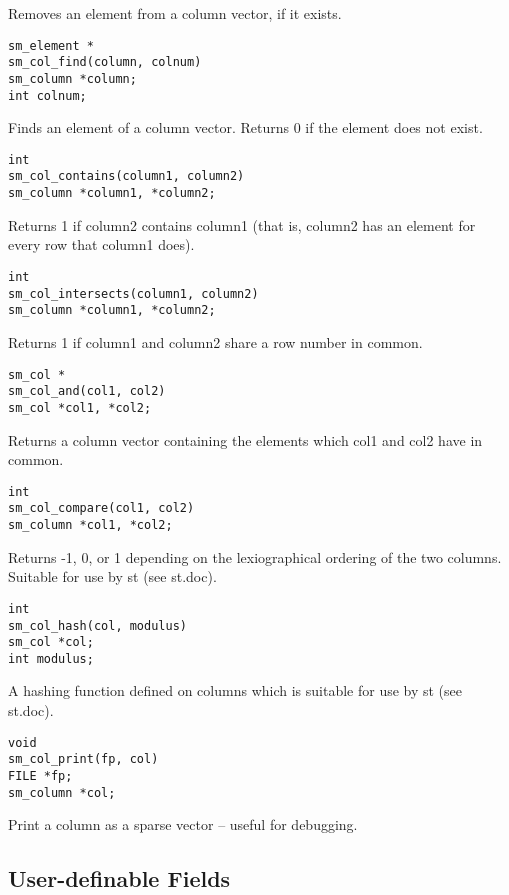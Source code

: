         Removes an element from a column vector, if it exists.


\begin{verbatim}
sm_element *
sm_col_find(column, colnum)
sm_column *column;
int colnum;
\end{verbatim}

        Finds an element of a column vector.  Returns 0 if the element does not
        exist.


\begin{verbatim}
int
sm_col_contains(column1, column2)
sm_column *column1, *column2;
\end{verbatim}

        Returns 1 if column2 contains column1 (that is, column2 has
        an element for every row that column1 does).


\begin{verbatim}
int
sm_col_intersects(column1, column2)
sm_column *column1, *column2;
\end{verbatim}

        Returns 1 if column1 and column2 share a row number in common.


\begin{verbatim}
sm_col *
sm_col_and(col1, col2)
sm_col *col1, *col2;
\end{verbatim}

        Returns a column vector containing the elements which col1 and
        col2 have in common.


\begin{verbatim}
int
sm_col_compare(col1, col2)
sm_column *col1, *col2;
\end{verbatim}

        Returns -1, 0, or 1 depending on the lexiographical ordering
        of the two columns.  Suitable for use by st (see st.doc).


\begin{verbatim}
int
sm_col_hash(col, modulus)
sm_col *col;
int modulus;
\end{verbatim}

        A hashing function defined on columns which is suitable for use
        by st (see st.doc).


\begin{verbatim}
void
sm_col_print(fp, col)
FILE *fp;
sm_column *col;
\end{verbatim}

        Print a column as a sparse vector -- useful for debugging.

\subsection{User-definable Fields}

